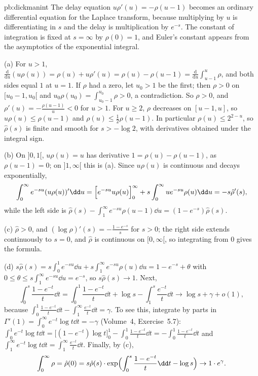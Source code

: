 \begin{solution}{pb:dickmanint}
\idea The delay equation $u\rho'(u)=-\rho(u-1)$ becomes an ordinary differential equation for the Laplace transform, because multiplying by $u$ is differentiating in $s$ and the delay is
multiplication by $e^{-s}$. The constant of integration is fixed at $s=\infty$ by $\rho(0)=1$, and Euler's constant appears from the asymptotics of the exponential integral.

\writeup (a) For $u>1$, $\frac{\mathrm d}{\mathrm du}(u\rho(u))=\rho(u)+u\rho'(u)=\rho(u)-\rho(u-1)=\frac{\mathrm d}{\mathrm du}\int_{u-1}^u\rho$, and both sides equal $1$ at $u=1$. If $\rho$ had a zero,
let $u_0>1$ be the first; then $\rho>0$ on $[u_0-1,u_0[$ and $u_0\rho(u_0)=\int_{u_0-1}^{u_0}\rho>0$, a contradiction. So $\rho>0$, and $\rho'(u)=-\frac{\rho(u-1)}u<0$ for $u>1$. For
$u\ge2$, $\rho$ decreases on $[u-1,u]$, so $u\rho(u)\le\rho(u-1)$ and $\rho(u)\le\frac12\rho(u-1)$. In particular $\rho(u)\le2^{2-u}$, so $\hat\rho(s)$ is finite and smooth for
$s>-\log2$, with derivatives obtained under the integral sign.

(b) On $]0,1[$, $u\rho(u)=u$ has derivative $1=\rho(u)-\rho(u-1)$, as $\rho(u-1)=0$; on $]1,\infty[$ this is (a). Since $u\rho(u)$ is continuous and decays exponentially,
\[
\int_0^\infty e^{-su}(u\rho(u))'\dd u=\Bigl[e^{-su}u\rho(u)\Bigr]_0^\infty+s\int_0^\infty ue^{-su}\rho(u)\dd u=-s\hat\rho'(s),
\]
while the left side is $\hat\rho(s)-\int_1^\infty e^{-su}\rho(u-1)\dd u=(1-e^{-s})\hat\rho(s)$.

(c) $\hat\rho>0$, and $(\log\hat\rho)'(s)=-\frac{1-e^{-s}}s$ for $s>0$; the right side extends continuously to $s=0$, and $\hat\rho$ is continuous on $[0,\infty[$, so integrating from $0$ gives the formula.

(d) $s\hat\rho(s)=s\int_0^1e^{-su}\dd u+s\int_1^\infty e^{-su}\rho(u)\dd u=1-e^{-s}+\theta$ with $0\le\theta\le s\int_1^\infty e^{-su}\dd u=e^{-s}$, so $s\hat\rho(s)\to1$. Next,
\[
\int_0^s\frac{1-e^{-t}}t\dd t=\int_0^1\frac{1-e^{-t}}t\dd t+\log s-\int_1^s\frac{e^{-t}}t\dd t\to\log s+\gamma+o(1),
\]
because $\int_0^1\frac{1-e^{-t}}t\dd t-\int_1^\infty\frac{e^{-t}}t\dd t=\gamma$. To see this, integrate by parts in $\Gamma'(1)=\int_0^\infty e^{-t}\log t\dd t=-\gamma$ (Volume~4, Exercise~5.7):
$\int_0^1e^{-t}\log t\dd t=\bigl[(1-e^{-t})\log t\bigr]_0^1-\int_0^1\frac{1-e^{-t}}t\dd t=-\int_0^1\frac{1-e^{-t}}t\dd t$ and $\int_1^\infty e^{-t}\log t\dd t=\int_1^\infty\frac{e^{-t}}t\dd t$. Finally, by (c),
\[
\int_0^\infty\rho=\hat\rho(0)=s\hat\rho(s)\cdot\exp\Bigl(\int_0^s\frac{1-e^{-t}}t\dd t-\log s\Bigr)\to1\cdot e^\gamma.
\]


\end{solution}
